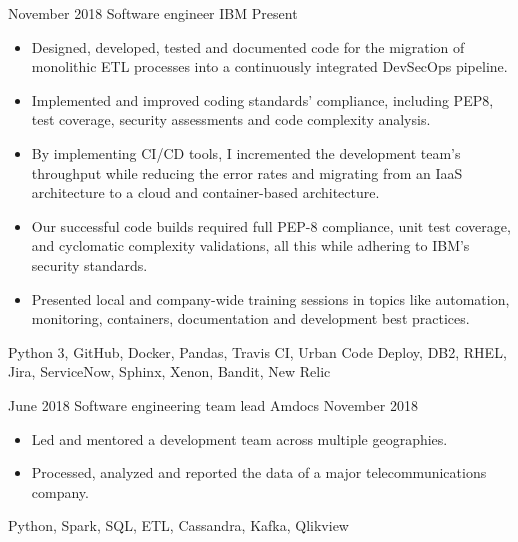 %
%
%


\begin{experiences}
    \experience
        {November 2018}
        {Software engineer}
        {IBM}
        {Present}
        {
            \begin{itemize}
                \item Designed, developed, tested and documented code for the migration of monolithic ETL processes into a continuously integrated DevSecOps pipeline.
                \item Implemented and improved coding standards' compliance, including PEP8, test coverage, security assessments and code complexity analysis.
                \item By implementing CI/CD tools, I incremented the development team's throughput while reducing the error rates and migrating from an IaaS architecture to a cloud and container-based architecture.
				\item Our successful code builds required full PEP-8 compliance, unit test coverage, and cyclomatic complexity validations, all this while adhering to IBM's security standards.
				\item Presented local and company-wide training sessions in topics like automation, monitoring, containers, documentation and development best practices.
            \end{itemize}
        }
        {
            Python 3,
            GitHub,
            Docker,
            Pandas,
            Travis CI,
            Urban Code Deploy,
            DB2,
            RHEL,
            Jira,
            ServiceNow,
            Sphinx,
            Xenon,
            Bandit,
            New Relic
        }

    \emptySeparator

    \experience
        {June 2018}
        {Software engineering team lead}
        {Amdocs}
        {November 2018}
        {
            \begin{itemize}
                \item Led and mentored a development team across multiple 
                geographies.
                \item Processed, analyzed and reported 
                the data of a major telecommunications company.
            \end{itemize}
        }
        {
            Python,
            Spark,
            SQL,
            ETL,
            Cassandra,
            Kafka,
            Qlikview
        }


\end{experiences}
